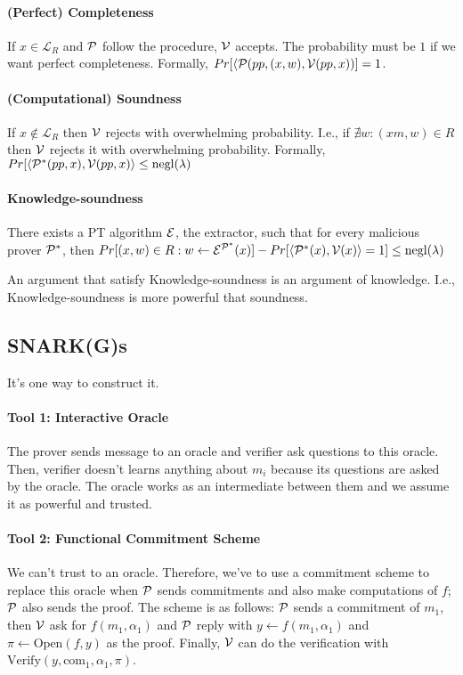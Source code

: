   \paragraph{(Perfect) Completeness}
  If $x \in \mathcal{L}_R$ and $\mathcal{P}$ follow the procedure, $\mathcal{V}$ accepts.
  The probability must be $1$ if we want perfect completeness.
  Formally, $Pr[\langle \mathcal{P}(pp,(x,w), \mathcal{V}(pp,x))] = 1$.

  \paragraph{(Computational) Soundness}
  If $x\notin\mathcal{L}_R$ then $\mathcal{V}$ rejects with overwhelming probability.
  I.e., if $\nexists w : (xm,w) \in R$ then $\mathcal{V}$ rejects it with overwhelming probability.
  Formally, $Pr[\langle \mathcal{P}^*(pp,x),\mathcal{V}(pp,x)\rangle \leq \text{negl}(\lambda)$

  \paragraph{Knowledge-soundness}
  There exists a PT algorithm $\mathcal{E}$, the extractor, such that for every malicious prover $\mathcal{P}^*$,
  then $Pr[(x,w) \in R : w \leftarrow \mathcal{E}^{\mathcal{P}^*}(x)] - Pr[\langle \mathcal{P}^*(x),\mathcal{V}(x)\rangle = 1] \leq \text{negl}(\lambda)$

  An argument that satisfy Knowledge-soundness is an argument of knowledge.
  I.e., Knowledge-soundness is more powerful that soundness.

  \subsection{SNARK(G)s}
  It's one way to construct it.
  
  \paragraph{Tool 1: Interactive Oracle}
  The prover sends message to an oracle and verifier ask questions to this oracle.
  Then, verifier doesn't learns anything about $m_i$ because its questions are asked by the oracle.
  The oracle works as an intermediate between them and we assume it as powerful and trusted.

  \paragraph{Tool 2: Functional Commitment Scheme}
  We can't trust to an oracle.
  Therefore, we've to use a commitment scheme to replace this oracle when $\mathcal{P}$ sends 
  commitments and also make computations of $f$; $\mathcal{P}$ also sends the proof.
  The scheme is as follows: $\mathcal{P}$ sends a commitment of $m_1$, then $\mathcal{V}$ ask for $f(m_1,\alpha_1)$
  and $\mathcal{P}$ reply with $y \leftarrow f(m_1,\alpha_1)$ and $\pi \leftarrow \text{Open}(f, y)$ as the proof.
  Finally, $\mathcal{V}$ can do the verification with $\text{Verify}(y,\text{com}_1,\alpha_1,\pi)$.

